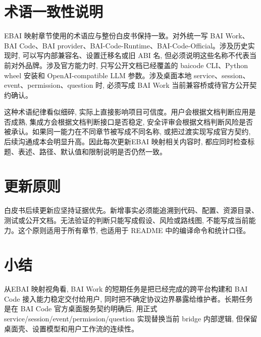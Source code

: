 \section{术语一致性说明}
EBAI 映射章节使用的术语应与整份白皮书保持一致。对外统一写 BAI Work、BAI Code、BAI provider、BAI-Code-Runtime、BAI-Code-Official。涉及历史实现时, 可以写内部兼容名、设置迁移名或旧 ABI 名, 但必须说明这些名称不代表当前对外品牌。涉及官方能力时, 只写公开文档已经覆盖的 baicode CLI、Python wheel 安装和 OpenAI-compatible LLM 参数。涉及桌面本地 service、session、event、permission、question 时, 必须写成 BAI Work 当前兼容桥或待官方公开契约确认。

这种术语纪律看似细碎, 实际上直接影响项目可信度。用户会根据文档判断应用是否成熟, 集成方会根据文档判断接口是否稳定, 安全评审会根据文档判断风险是否被承认。如果同一能力在不同章节被写成不同名称, 或把过渡实现写成官方契约, 后续沟通成本会明显升高。因此每次更新EBAI 映射相关内容时, 都应同时检查标题、表述、路径、默认值和限制说明是否仍然一致。

\section{更新原则}
白皮书后续更新应坚持证据优先。新增事实必须能追溯到代码、配置、资源目录、测试或公开文档。无法验证的判断只能写成假设、风险或路线图, 不能写成当前能力。这个原则适用于所有章节, 也适用于 README 中的编译命令和统计口径。

\section{小结}
从EBAI 映射视角看, BAI Work 的短期任务是把已经完成的跨平台构建和 BAI Code 接入能力稳定交付给用户, 同时把不确定协议边界暴露给维护者。长期任务是在 BAI Code 官方桌面服务契约明确后, 用正式 service/session/event/permission/question 实现替换当前 bridge 内部逻辑, 但保留桌面壳、设置模型和用户工作流的连续性。
